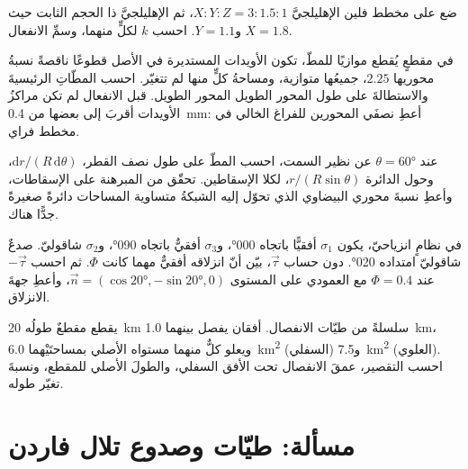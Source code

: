 \begin{exercise}[$\star\star$]\label{exo:b3:structural-analysis:8}
ضع على مخطط فلين الإهليلجيَّ $X : Y : Z = 3 : 1.5 : 1$، ثم
الإهليلجيَّ ذا الحجم الثابت حيث $X = 1.8$ و$Y = 1.1$. احسب $k$ لكلٍّ
منهما، وسمِّ الانفعال.
\end{exercise}

\begin{exercise}[$\star\star$]\label{exo:b3:structural-analysis:9}
في مقطعٍ يُقطع موازيًا للمطّ، تكون الأويدات المستديرة في الأصل
قطوعًا ناقصةً نسبةُ محوريها $2.25$، جميعُها متوازية، ومساحةُ كلٍّ منها
لم تتغيّر. احسب المطّاتِ الرئيسيةَ والاستطالةَ على طول المحور الطويل
المحور الطويل. قبل الانفعال لم تكن مراكزُ الأويدات أقربَ إلى بعضها من
\qty{0.4}{mm}: أعطِ نصفَي المحورين للفراغ الخالي في مخطط فراي.
\end{exercise}

\begin{exercise}[$\star\star\star$]\label{exo:b3:structural-analysis:10}
عند $\theta = \ang{60}$ عن نظير السمت، احسب المطّ على طول نصف القطر،
$\mathrm dr/(R\,\mathrm d\theta)$، وحول الدائرة $r/(R\sin\theta)$،
لكلا الإسقاطين. تحقّق من المبرهنة على الإسقاطات، وأعطِ نسبةَ
محوري البيضاوي الذي تحوّل إليه الشبكةُ متساوية المساحات دائرةً صغيرةً
جدًّا هناك.
\end{exercise}

\begin{exercise}[$\star\star\star$]\label{exo:b3:structural-analysis:11}
في نظامٍ انزياحيّ، يكون $\sigma_1$ أفقيًّا باتجاه \ang{000}،
و$\sigma_3$ أفقيٌّ باتجاه \ang{090}، و$\sigma_2$ شاقوليّ. صدعٌ
شاقوليّ امتداده \ang{020}. دون حساب $\vec\tau$، بيّن أنّ انزلاقه
أفقيٌّ مهما كانت $\Phi$. ثم احسب $-\vec\tau$ عند $\Phi = 0.4$ مع
العمودي على المستوى $\vec n = (\cos\ang{20}, -\sin\ang{20}, 0)$، وأعطِ
جهةَ الانزلاق.
\end{exercise}

\begin{exercise}[$\star\star\star$]\label{exo:b3:structural-analysis:12}
يقطع مقطعٌ طولُه \qty{20}{km} سلسلةً من طيّات الانفصال. أفقان يفصل بينهما
\qty{1.0}{km}، ويعلو كلٌّ منهما مستواه الأصلي بمساحتَيْهما
\qty{6.0}{km^2} (السفلي) و\qty{7.5}{km^2} (العلوي). احسب التقصير،
عمقَ الانفصال تحت الأفق السفلي، والطولَ الأصلي
للمقطع، ونسبةَ تغيّر طوله.
\end{exercise}

\section{مسألة: طيّات وصدوع تلال فاردن}

